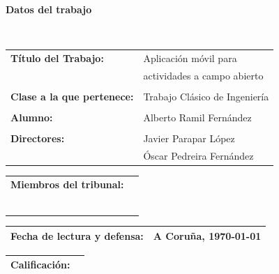 \documentclass[11pt,a4paper,titlepage,twoside,openright]{report}
\begin{document}
\begin{titlepage}
\begin{Huge}{\bf Datos del trabajo}\end{Huge}\\
\newline

\begin{tabularx}{\textwidth}{XX}
\hline
{\large {\bf Título del Trabajo:}} & {\large Aplicación móvil para }\\
	& {\large actividades a campo abierto}\\
& \\
{\large {\bf Clase a la que pertenece:}} & {\large Trabajo Clásico de Ingeniería}\\
& \\
{\large {\bf Alumno:}}  & {\large Alberto Ramil Fernández }\\
& \\
{\large {\bf Directores:}} &{\large Javier Parapar López} \\
 &{\large Óscar Pedreira Fernández} \\\hline
\end{tabularx}

\vspace{1cm}

\begin{tabularx}{\textwidth}{ll}
\hline
{\large {\bf Miembros del tribunal:}}\\
\\
\\
\\
\\
\\
\\ \hline
\end{tabularx}

\vspace{1cm}

\begin{tabularx}{\textwidth}{XX}
\hline
{\large {\bf Fecha de lectura y defensa:}} & {\large A Coruña, \today}\\
\hline
\end{tabularx}

\vspace{1cm}

\begin{tabularx}{\textwidth}{XX}
\hline
{\large {\bf Calificación:}} & \\
\hline
\end{tabularx}

\end{titlepage}
\cleardoublepage
\end{document}
